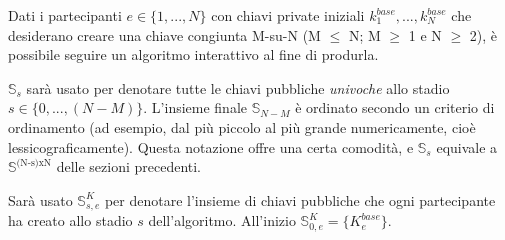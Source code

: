 Dati i partecipanti $e \in \{1,...,N\}$ con chiavi private iniziali $k^{base}_1,...,k^{base}_N$ che desiderano creare una chiave congiunta M-su-N (M $\leq$ N; M $\geq$ 1 e N $\geq$ 2), è possibile seguire un algoritmo interattivo al fine di produrla.

$\mathbb{S}_s$ sarà usato per denotare tutte le chiavi pubbliche \emph{univoche} allo stadio $s \in \{0,...,(N-M)\}$. L'insieme finale $\mathbb{S}_{N-M}$ è ordinato secondo un criterio di ordinamento (ad esempio, dal più piccolo al più grande numericamente, cioè lessicograficamente). Questa notazione offre una certa comodità, e $\mathbb{S}_s$ equivale a $\mathbb{S}^{\textrm{(N-s)xN}}$ delle sezioni precedenti.

Sarà usato $\mathbb{S}^K_{s,e}$ per denotare l'insieme di chiavi pubbliche che ogni partecipante ha creato allo stadio $s$ dell'algoritmo. All'inizio $\mathbb{S}^K_{0,e} = \{K^{base}_e\}$.

